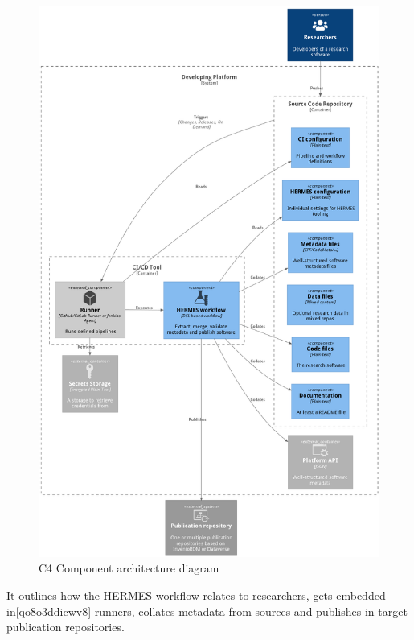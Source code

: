 \documentclass{article}
\begin{document}
\begin{figure}
\centering
\includegraphics[width=\textwidth]{assets/uvwszplpisk.png}
\caption{C4 Component architecture diagram}
\label{uvwszplpisk}
\end{figure}
It outlines how the HERMES workflow relates to researchers, gets embedded in\ref{qo8o3ddicwv8} runners, collates metadata from sources and publishes in target publication repositories.
\end{document}
